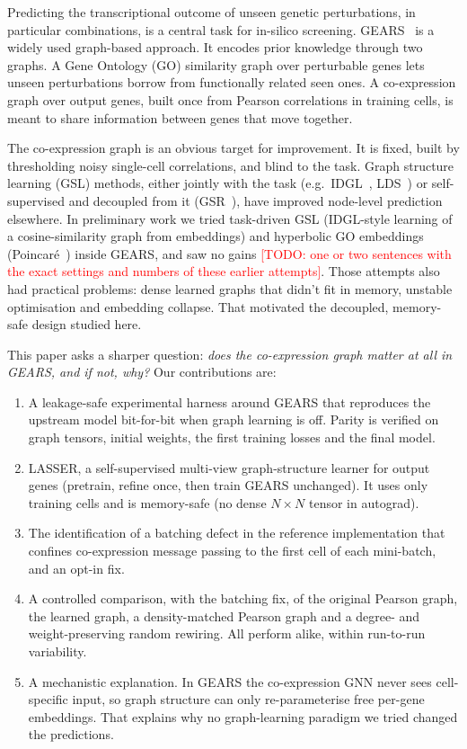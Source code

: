 \documentclass[11pt]{article}
\newcommand{\todo}[1]{\textcolor{red}{[TODO: #1]}}
\newcommand{\GEARS}{\textsc{GEARS}}
\newcommand{\LASSER}{\textsc{LASSER}}
\begin{document}
Predicting the transcriptional outcome of unseen genetic perturbations, in particular combinations, is a central
task for in-silico screening. \GEARS{}~\cite{roohani2024gears} is a widely used graph-based approach. It encodes
prior knowledge through two graphs. A Gene Ontology (GO) similarity graph over perturbable genes lets unseen
perturbations borrow from functionally related seen ones. A co-expression graph over output genes, built once from
Pearson correlations in training cells, is meant to share information between genes that move together.

The co-expression graph is an obvious target for improvement. It is fixed, built by thresholding noisy
single-cell correlations, and blind to the task. Graph structure learning (GSL) methods, either jointly with the
task (e.g.\ IDGL~\cite{chen2020idgl}, LDS~\cite{franceschi2019lds}) or self-supervised and decoupled from it
(GSR~\cite{zhao2023gsr}), have improved node-level prediction elsewhere. In preliminary work we tried task-driven
GSL (IDGL-style learning of a cosine-similarity graph from embeddings) and hyperbolic GO embeddings
(Poincar\'e~\cite{nickel2017poincare}) inside \GEARS{}, and saw no gains
\todo{one or two sentences with the exact settings and numbers of these earlier attempts}. Those attempts also had
practical problems: dense learned graphs that didn't fit in memory, unstable optimisation and embedding collapse.
That motivated the decoupled, memory-safe design studied here.

This paper asks a sharper question: \emph{does the co-expression graph matter at all in \GEARS{}, and if not, why?}
Our contributions are:
\begin{enumerate}
  \item A leakage-safe experimental harness around \GEARS{} that reproduces the upstream model bit-for-bit when graph
        learning is off. Parity is verified on graph tensors, initial weights, the first training losses and the
        final model.
  \item \LASSER{}, a self-supervised multi-view graph-structure learner for output genes (pretrain, refine once,
        then train \GEARS{} unchanged). It uses only training cells and is memory-safe (no dense $N{\times}N$ tensor
        in autograd).
  \item The identification of a batching defect in the reference implementation that confines co-expression
        message passing to the first cell of each mini-batch, and an opt-in fix.
  \item A controlled comparison, with the batching fix, of the original Pearson graph, the learned graph, a
        density-matched Pearson graph and a degree- and weight-preserving random rewiring. All perform alike, within
        run-to-run variability.
  \item A mechanistic explanation. In \GEARS{} the co-expression GNN never sees cell-specific input, so graph
        structure can only re-parameterise free per-gene embeddings. That explains why no graph-learning paradigm
        we tried changed the predictions.
\end{enumerate}
\end{document}
